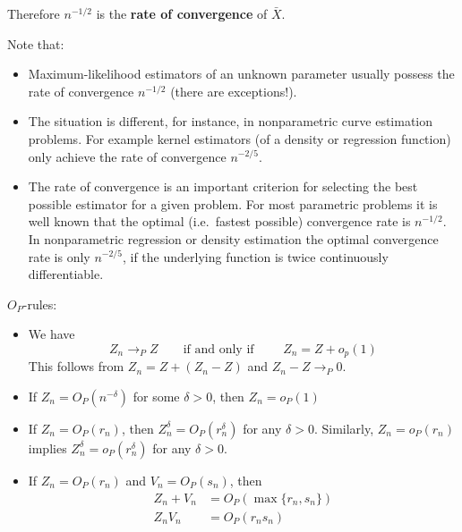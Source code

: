 \documentclass[]{book}
\providecommand{\tightlist}{%
  \setlength{\itemsep}{0pt}\setlength{\parskip}{0pt}}
\theoremstyle{definition}
\theoremstyle{definition}
\theoremstyle{definition}
\theoremstyle{remark}
\begin{document}
Therefore \(n^{-1/2}\) is the \textbf{rate of convergence} of \(\bar X\).

Note that:

\begin{itemize}
\tightlist
\item
  Maximum-likelihood estimators of an unknown parameter usually possess the rate of convergence \(n^{-1/2}\) (there are exceptions!).
\item
  The situation is different, for instance, in nonparametric curve estimation problems. For example kernel estimators (of a density or regression function) only achieve the rate of convergence \(n^{-2/5}\).
\item
  The rate of convergence is an important criterion for selecting the best possible estimator for a given problem. For most parametric problems it is well known that the optimal (i.e.~fastest possible) convergence rate is \(n^{-1/2}\). In nonparametric regression or density estimation the optimal convergence rate is only \(n^{-2/5}\), if the underlying function is twice continuously differentiable.
\end{itemize}

\(O_P\)-rules:

\begin{itemize}
\tightlist
\item
  We have
  \[Z_n\rightarrow_P Z \qquad \text{if and only if }\qquad Z_n=Z+o_p(1)\]
  This follows from \(Z_n=Z+(Z_n-Z)\) and \(Z_n-Z\rightarrow_P 0\).
\end{itemize}

\begin{itemize}
\tightlist
\item
  If \(Z_n=O_P(n^{-\delta})\) for some \(\delta>0\), then \(Z_n=o_P(1)\)
\end{itemize}

\begin{itemize}
\tightlist
\item
  If \(Z_n=O_P(r_n)\), then \(Z_n^\delta=O_P(r_n^\delta)\) for any \(\delta>0\). Similarly,
  \(Z_n=o_P(r_n)\) implies \(Z_n^\delta=o_P(r_n^\delta)\) for any \(\delta>0\).
\end{itemize}

\begin{itemize}
\tightlist
\item
  If \(Z_n=O_P(r_n)\) and \(V_n=O_P(s_n)\), then
  \begin{align*}
  Z_n+V_n & =O_P(\max\{r_n,s_n\})\\
  Z_nV_n &  =O_P(r_ns_n)
  \end{align*}
\end{itemize}
\end{document}
